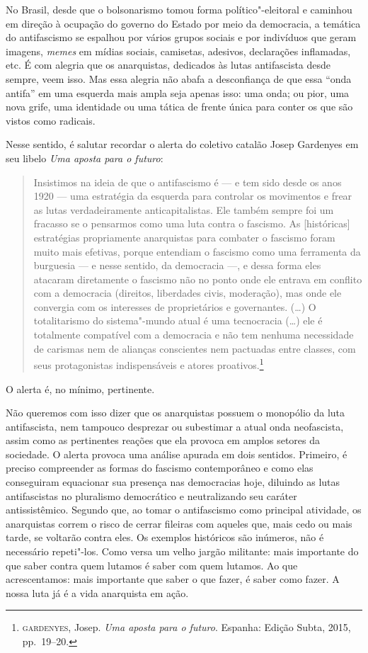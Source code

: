 No Brasil, desde que o bolsonarismo tomou forma político"-eleitoral e caminhou em direção à ocupação do governo do Estado por meio da democracia, a temática do antifascismo se espalhou por vários grupos sociais e por indivíduos que geram imagens, \emph{memes} em mídias sociais, camisetas, adesivos, declarações inflamadas, etc. É com alegria que os anarquistas, dedicados às lutas antifascista desde sempre, veem isso. Mas essa alegria não abafa a desconfiança de que essa ``onda antifa'' em uma esquerda mais ampla seja apenas isso: uma onda; ou pior, uma nova grife, uma identidade ou uma tática de frente única para conter os que são vistos como radicais.

Nesse sentido, é salutar recordar o alerta do coletivo catalão Josep Gardenyes em seu libelo \emph{Uma aposta para o futuro}: 

\begin{quote}
Insistimos na ideia de que o antifascismo é --- e tem sido desde os anos 1920 --- uma estratégia da esquerda para controlar os movimentos e frear as lutas verdadeiramente anticapitalistas. Ele também sempre foi um fracasso se o pensarmos como uma luta contra o fascismo. As [históricas] estratégias propriamente anarquistas para combater o fascismo foram muito mais efetivas, porque entendiam o fascismo como uma ferramenta da burguesia --- e nesse sentido, da democracia ---, e dessa forma eles atacaram diretamente o fascismo não no ponto onde ele entrava em conflito com a democracia (direitos, liberdades civis, moderação), mas onde ele convergia com os interesses de proprietários e governantes. (\ldots{}) O totalitarismo do sistema"-mundo atual é uma tecnocracia (\ldots{}) ele é totalmente compatível com a democracia e não tem nenhuma necessidade de carismas nem de alianças conscientes nem pactuadas entre classes, com seus protagonistas indispensáveis e atores proativos.\footnote{\textsc{gardenyes}, Josep. \emph{Uma aposta para o futuro}. Espanha: Edição Subta, 2015, pp.~19--20.}
\end{quote}

O alerta é, no mínimo, pertinente.

Não queremos com isso dizer que os anarquistas possuem o monopólio da luta antifascista, nem tampouco desprezar ou subestimar a atual onda neofascista, assim como as pertinentes reações que ela provoca em amplos setores da sociedade. O alerta provoca uma análise apurada em dois sentidos. Primeiro, é preciso compreender as formas do fascismo contemporâneo e como elas conseguiram equacionar sua presença nas democracias hoje, diluindo as lutas antifascistas no pluralismo democrático e neutralizando seu caráter antissistêmico. Segundo que, ao tomar o antifascismo como principal atividade, os anarquistas correm o risco de cerrar fileiras com aqueles que, mais cedo ou mais tarde, se voltarão contra eles. Os exemplos históricos são inúmeros, não é necessário repeti"-los. Como versa um velho jargão militante: mais importante do que saber contra quem lutamos é saber com quem lutamos. Ao que acrescentamos: mais importante que saber o que fazer, é saber como fazer. A nossa luta já é a vida anarquista em ação.

